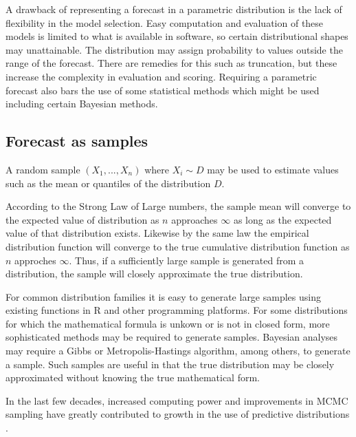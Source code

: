 \documentclass{article}\usepackage[]{graphicx}\usepackage[]{color}
\begin{document}
A drawback of representing a forecast in a parametric distribution is the lack 
of flexibility in the model selection. Easy computation and evaluation of these 
models is limited to what is available in software, so certain distributional
shapes may unattainable. The distribution may assign probability to values
outside the range of the forecast. There are remedies for this such as 
truncation, but these increase the complexity in evaluation and scoring.
Requiring a parametric forecast also bars the use of some statistical methods
which might be used including certain Bayesian methods.


\subsection{Forecast as samples}
A random sample $(X_1,...,X_n)$ where $X_i \sim D$ may be used to 
estimate values such as the mean or quantiles of the distribution $D$. 

According to the Strong Law of Large numbers, the sample mean will converge to
the expected value of distribution as $n$ approaches $\infty$ as long as the 
expected value of that distribution exists. Likewise by the same law the 
empirical distribution function will converge to the true cumulative 
distribution function as $n$ approches $\infty$. Thus, if a sufficiently large 
sample is generated from a distribution, the sample will closely approximate the 
true distribution. 

For common distribution families it is easy to generate large samples using 
existing functions in R and other programming platforms. For some distributions 
for which the mathematical formula is unkown or is not in closed form, more 
sophisticated methods may be required to generate samples. Bayesian analyses may 
require a Gibbs or Metropolis-Hastings algorithm, among others, to generate a 
sample. Such samples are useful in that the true distribution may be closely 
approximated without knowing the true mathematical form. 

In the last few decades, increased computing power and improvements in MCMC
sampling have greatly contributed to growth in the use of
predictive distributions \cite{gneiting2007strictly}.
\end{document}
